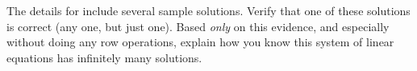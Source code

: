 The details for  include several sample solutions.  Verify that one of these solutions is correct (any one, but just one).  Based \emph{only} on this evidence, and especially without doing any row operations, explain how you know this system of linear equations has infinitely many solutions.
